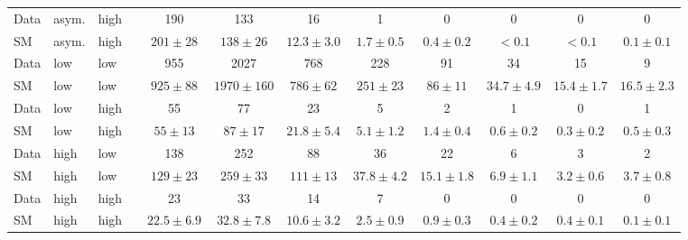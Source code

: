 \begin{table}[h!]
{\begin{tabular}{lllccccccccc}
Data  & asym.                        & high &  & 190                & 133                  & 16                 & 1                & 0                & 0               & 0              & 0              \\
SM    & asym.                        & high &  & $201 \pm 28$       & $138 \pm 26$         & $12.3 \pm 3.0$     & $1.7 \pm 0.5$    & $0.4 \pm 0.2$    & $<0.1$          & $<0.1$         & $0.1 \pm 0.1$  \\[0.5ex]
Data  & low                          & low  &  & 955                & 2027                 & 768                & 228              & 91               & 34              & 15             & 9              \\
SM    & low                          & low  &  & $925 \pm 88$       & $1970 \pm 160$       & $786 \pm 62$       & $251 \pm 23$     & $86 \pm 11$      & $34.7 \pm 4.9$  & $15.4 \pm 1.7$ & $16.5 \pm 2.3$ \\[0.5ex]
Data  & low                          & high &  & 55                 & 77                   & 23                 & 5                & 2                & 1               & 0              & 1              \\
SM    & low                          & high &  & $55 \pm 13$        & $87 \pm 17$          & $21.8 \pm 5.4$     & $5.1 \pm 1.2$    & $1.4 \pm 0.4$    & $0.6 \pm 0.2$   & $0.3 \pm 0.2$  & $0.5 \pm 0.3$  \\[0.5ex]
Data  & high                         & low  &  & 138                & 252                  & 88                 & 36               & 22               & 6               & 3              & 2              \\
SM    & high                         & low  &  & $129 \pm 23$       & $259 \pm 33$         & $111 \pm 13$       & $37.8 \pm 4.2$   & $15.1 \pm 1.8$   & $6.9 \pm 1.1$   & $3.2 \pm 0.6$  & $3.7 \pm 0.8$  \\[0.5ex]
Data  & high                         & high &  & 23                 & 33                   & 14                 & 7                & 0                & 0               & 0              & 0              \\
SM    & high                         & high &  & $22.5 \pm 6.9$     & $32.8 \pm 7.8$       & $10.6 \pm 3.2$     & $2.5 \pm 0.9$    & $0.9 \pm 0.3$    & $0.4 \pm 0.2$   & $0.4 \pm 0.1$  & $0.1 \pm 0.1$  \\[0.5ex]

\end{tabular}}
\end{table}
